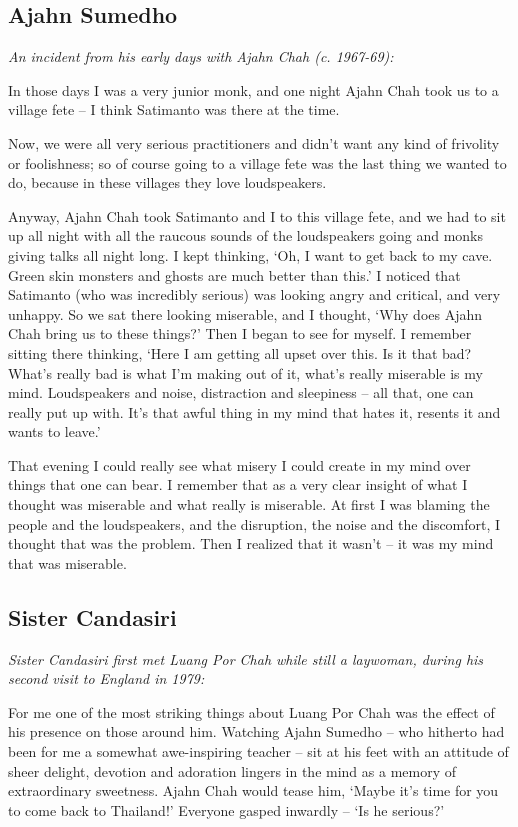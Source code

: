 \subsection{Ajahn Sumedho}

\emph{An incident from his early days with Ajahn Chah (c. 1967-69):}

In those days I was a very junior monk, and one night Ajahn Chah took us
to a village fete -- I think Satimanto was there at the time. 

Now, we were all very serious practitioners and didn't want any kind of
frivolity or foolishness; so of course going to a village fete was the
last thing we wanted to do, because in these villages they love
loudspeakers. 

Anyway, Ajahn Chah took Satimanto and I to this village fete, and we had
to sit up all night with all the raucous sounds of the loudspeakers
going and monks giving talks all night long. I kept thinking, `Oh, I
want to get back to my cave. Green skin monsters and ghosts are much
better than this.' I noticed that Satimanto (who was incredibly serious) 
was looking angry and critical, and very unhappy. So we sat there
looking miserable, and I thought, `Why does Ajahn Chah bring us to these
things?' Then I began to see for myself. I remember sitting there
thinking, `Here I am getting all upset over this. Is it that bad? What's
really bad is what I'm making out of it, what's really miserable is my
mind. Loudspeakers and noise, distraction and sleepiness -- all that, 
one can really put up with. It's that awful thing in my mind that hates
it, resents it and wants to leave.'

That evening I could really see what misery I could create in my mind
over things that one can bear. I remember that as a very clear insight
of what I thought was miserable and what really is miserable. At first I
was blaming the people and the loudspeakers, and the disruption, the
noise and the discomfort, I thought that was the problem. Then I
realized that it wasn't -- it was my mind that was miserable. 

\subsection{Sister Candasiri}

\emph{Sister Candasiri first met Luang Por Chah while still a
laywoman, during his second visit to England in 1979:}

For me one of the most striking things about Luang Por Chah was the
effect of his presence on those around him. Watching Ajahn Sumedho --
who hitherto had been for me a somewhat awe-inspiring teacher -- sit at
his feet with an attitude of sheer delight, devotion and adoration
lingers in the mind as a memory of extraordinary sweetness. Ajahn Chah
would tease him, `Maybe it's time for you to come back to Thailand!'
Everyone gasped inwardly -- `Is he serious?'

